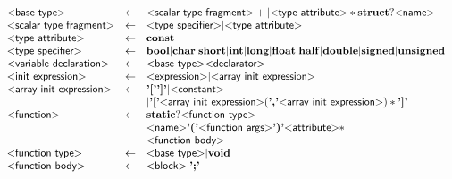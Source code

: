 \begin{figure}
\[\begin{array}{lcl}
  \text{\sf\textless base type\textgreater} & \gets & \text{\sf\textless scalar type fragment\textgreater}+
                               | \text{\sf\textless type attribute\textgreater}* \mathbf{struct}? \text{\sf\textless name\textgreater}\\


  \text{\sf\textless scalar type fragment\textgreater} & \gets & \text{\sf\textless type specifier\textgreater} | \text{\sf\textless type attribute\textgreater} \\

  \text{\sf\textless type attribute\textgreater} & \gets & \mathbf{const} \\

  \text{\sf\textless type specifier\textgreater} & \gets & \mathbf{bool}
                                    | \mathbf{char}
                                    | \mathbf{short}
                                    | \mathbf{int}
                                    | \mathbf{long}
                                    | \mathbf{float}
                                    | \mathbf{half}
                                    | \mathbf{double}
                                    | \mathbf{signed}
                                    | \mathbf{unsigned}
  \\

  \text{\sf\textless variable declaration\textgreater} & \gets & \text{\sf\textless base type\textgreater} \text{\sf\textless declarator\textgreater}
  \\

  \text{\sf\textless init expression\textgreater} & \gets & \text{\sf\textless expression\textgreater} | \text{\sf\textless array init expression\textgreater} \\

  \text{\sf\textless array init expression\textgreater} & \gets & \text{\bf'['}\text{\bf']'}
                                           |\text{\sf\textless constant\textgreater}\\
  & &                                      | \text{\bf'['} \text{\sf\textless array init expression\textgreater}
                                                        (\text{\bf','} \text{\sf\textless array init expression\textgreater})*
                                             \text{\bf']'}
  \\
  \text{\sf\textless function\textgreater} & \gets & \mathbf{static}? \text{\sf\textless function type\textgreater} \\
                                & & \text{\sf\textless name\textgreater}
                                \text{\bf'('} \text{\sf\textless function args\textgreater} \text{\bf')'} \text{\sf\textless attribute\textgreater}*\\
                                & & \text{\sf\textless function body\textgreater}
  \\
  \text{\sf\textless function type\textgreater} & \gets & \text{\sf\textless base type\textgreater} | \mathbf{void} \\

  \text{\sf\textless function body\textgreater} & \gets & \text{\sf\textless block\textgreater} | \text{\bf';'}\\


\end{array}\]
\end{figure}
